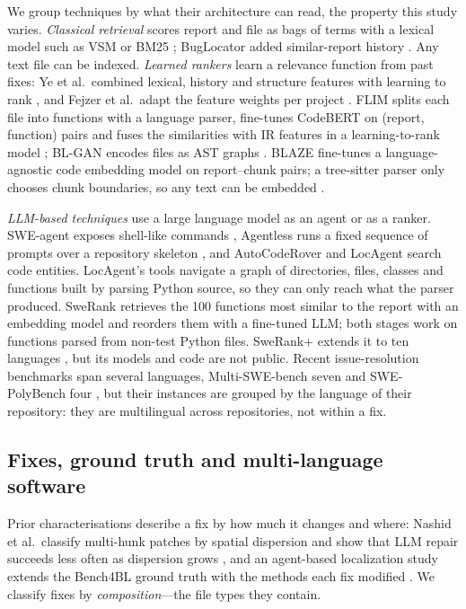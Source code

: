 \documentclass[a4paper,fleqn]{cas-dc}
\begin{document}
We group techniques by what their architecture can read, the property this
study varies. \emph{Classical retrieval} scores report and file as bags of
terms with a lexical model such as VSM or BM25
\citep{robertson2009probabilistic}; BugLocator added similar-report history
\citep{zhou2012should}. Any text file can be indexed. \emph{Learned rankers}
learn a relevance function from past fixes: Ye et al.\ combined lexical,
history and structure features with learning to rank \citep{ye2014learning},
and Fejzer et al.\ adapt the feature weights per project
\citep{fejzer2022tracking}. FLIM splits each file into functions with a
language parser, fine-tunes CodeBERT \citep{feng2020codebert} on
(report, function) pairs and fuses the similarities with IR features in a
learning-to-rank model \citep{liang2022modeling}; BL-GAN encodes files as AST
graphs \citep{zhu2022bl}. BLAZE fine-tunes a language-agnostic code embedding
model on report--chunk pairs; a tree-sitter parser only chooses chunk
boundaries, so any text can be embedded \citep{chakraborty2025blaze}.

\emph{LLM-based techniques} use a large language model as an agent or as a
ranker. SWE-agent exposes shell-like commands \citep{yang2024sweagent},
Agentless runs a fixed sequence of prompts over a repository skeleton
\citep{xia2024agentless}, and AutoCodeRover \citep{zhang2024autocoderover} and
LocAgent \citep{chen2025locagent} search code entities. LocAgent's tools
navigate a graph of directories, files, classes and functions built by
parsing Python source, so they can only reach what the parser produced.
SweRank \citep{reddy2025swerank} retrieves the 100 functions most similar to
the report with an embedding model and reorders them with a fine-tuned LLM;
both stages work on functions parsed from non-test Python files. SweRank+
extends it to ten languages \citep{reddy2025sweranplus}, but its models and
code are not public. Recent issue-resolution benchmarks span several
languages, Multi-SWE-bench seven \citep{zan2025multiswebench} and SWE-PolyBench
four \citep{rashid2025swepolybench}, but their instances are grouped by the
language of their repository: they are multilingual across repositories, not
within a fix.

\subsection{Fixes, ground truth and multi-language software}

Prior characterisations describe a fix by how much it changes and where:
Nashid et al.\ classify multi-hunk patches by spatial dispersion and show that
LLM repair succeeds less often as dispersion grows \citep{nashid2025multihunk},
and an agent-based localization study extends the Bench4BL ground truth with
the methods each fix modified \citep{samir2026cognigent}. We classify fixes by
\emph{composition}---the file types they contain.
\end{document}
